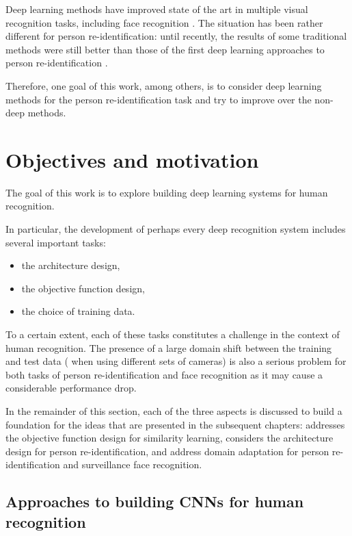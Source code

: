 Deep learning methods have improved state of the art in multiple visual recognition tasks, including face recognition \citep{Taigman14,parkhi2015deep,SchroffKP15}. The situation has been rather different for person re-identification:  until recently, the results of some traditional methods \citep{paisitkriangkrai2015learning} were still better than those of the first deep learning approaches to person re-identification \citep{Li14}. 

Therefore, one goal of this work, among others, is to consider deep learning methods for the person re-identification task and try to improve over the non-deep methods. 


\section{Objectives and motivation}

The goal of this work is to explore building deep learning systems for human recognition.

In particular, the development of perhaps every deep recognition system includes several important tasks: 
\begin{itemize}
    \item the architecture design,
    \item the objective function design,
    \item the choice of training data.
\end{itemize}
To a certain extent, each of these tasks constitutes a challenge in the context of human recognition. The presence of a large domain shift between the training and test data (\eg{} when using different sets of cameras) is also a serious problem for both tasks of person re-identification and face recognition as it may cause a considerable performance drop.

In the remainder of this section, each of the three aspects is discussed to build a foundation for the ideas that are presented in the subsequent chapters:  addresses the objective function design for similarity learning,  considers the architecture design for person re-identification,  and  address domain adaptation for person re-identification and surveillance face recognition. 


\subsection{Approaches to building CNNs for human recognition}
\label{sect:intro_siamese}

